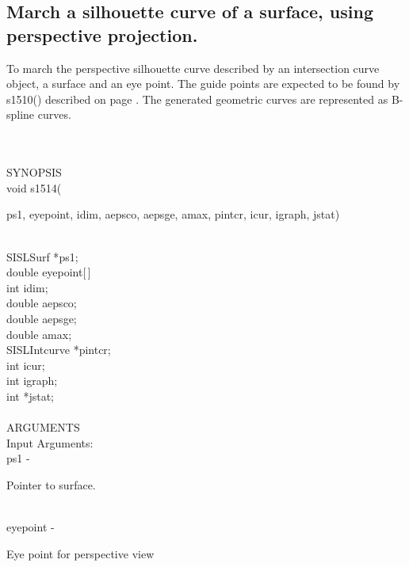 \subsection{\sloppy March a silhouette curve of a surface, using
perspective \mbox{projection}.}
\begin{minipg1}
  To march the perspective silhouette curve described by an intersection
  curve object, a surface and an eye point.
  The guide points are expected to be found by s1510() described on
  page \pageref{s1510}.
  The generated geometric curves are represented as B-spline curves.
\end{minipg1} \\ \\
SYNOPSIS\\
        \>void s1514(\begin{minipg3}
          {\fov ps1},  {\fov eyepoint},  {\fov idim},  {\fov aepsco},  {\fov aepsge},  {\fov amax},  {\fov pintcr},  {\fov icur},  {\fov igraph},  {\fov jstat})
        \end{minipg3}\\[0.3ex]
        \>\>    SISLSurf \> *{\fov ps1};\\
        \>\>    double   \> {\fov eyepoint}[\,]\\
        \>\>    int      \> {\fov idim};\\
        \>\>    double   \> {\fov aepsco};\\
        \>\>    double   \> {\fov aepsge};\\
        \>\>    double   \> {\fov amax};\\
        \>\>    SISLIntcurve \> *{\fov pintcr};\\
        \>\>    int      \> {\fov icur};\\
        \>\>    int      \> {\fov igraph};\\
        \>\>    int      \> *{\fov jstat};\\
\\
ARGUMENTS\\
        \>Input Arguments:\\
        \>\>    {\fov ps1}\> - \>  \begin{minipg2}
                     Pointer to surface.
                               \end{minipg2}\\
        \>\>    {\fov eyepoint}\> - \>  \begin{minipg2}
                     Eye point for perspective view
                               \end{minipg2}\\
